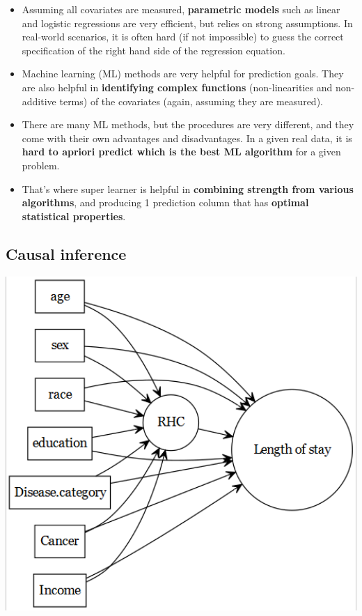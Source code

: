 \documentclass[
]{book}
\providecommand{\tightlist}{%
  \setlength{\itemsep}{0pt}\setlength{\parskip}{0pt}}
\begin{document}
\begin{itemize}
\tightlist
\item
  Assuming all covariates are measured, \textbf{parametric models} such as linear and logistic regressions are very efficient, but relies on strong assumptions. In real-world scenarios, it is often hard (if not impossible) to guess the correct specification of the right hand side of the regression equation.
\item
  Machine learning (ML) methods are very helpful for prediction goals. They are also helpful in \textbf{identifying complex functions} (non-linearities and non-additive terms) of the covariates (again, assuming they are measured).
\item
  There are many ML methods, but the procedures are very different, and they come with their own advantages and disadvantages. In a given real data, it is \textbf{hard to apriori predict which is the best ML algorithm} for a given problem.
\item
  That's where super learner is helpful in \textbf{combining strength from various algorithms}, and producing 1 prediction column that has \textbf{optimal statistical properties}.
\end{itemize}

\hypertarget{causal-inference}{%
\subsection{Causal inference}\label{causal-inference}}

\includegraphics[width=6.72in]{images/dagci}
\end{document}
